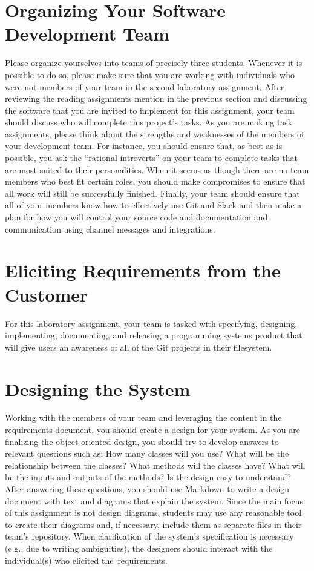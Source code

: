 \section*{Organizing Your Software Development Team}

Please organize yourselves into teams of precisely three students. Whenever it is possible to do so, please make sure that you are
working with individuals who were not members of your team in the second laboratory assignment. After reviewing the
reading assignments mention in the previous section and discussing the software that you are invited to implement for
this assignment, your team should discuss who will complete this project's tasks. As you are making task assignments,
please think about the strengths and weaknesses of the members of your development team. For instance, you should ensure
that, as best as is possible, you ask the ``rational introverts'' on your team to complete tasks that are most suited to
their personalities. When it seems as though there are no team members who best fit certain roles, you should make
compromises to ensure that all work will still be successfully finished. Finally, your team should ensure that all of
your members know how to effectively use Git and Slack and then make a plan for how you will control your source code
and documentation and communication using channel messages and integrations.

\section*{Eliciting Requirements from the Customer}

For this laboratory assignment, your team is tasked with specifying, designing, implementing, documenting, and releasing
a programming systems product that will give users an awareness of all of the Git projects in their filesystem.


\section*{Designing the System}

Working with the members of your team and leveraging the content in the requirements document, you should create a
design for your system.  As you are finalizing the object-oriented design, you should try to develop answers to relevant
questions such as: How many classes will you use? What will be the relationship between the classes? What methods will
the classes have? What will be the inputs and outputs of the methods?  Is the design easy to understand?  After
answering these questions, you should use Markdown to write a design document with text and diagrams that explain the
system. Since the main focus of this assignment is not design diagrams, students may use any reasonable tool to create
their diagrams and, if necessary, include them as separate files in their team's repository. When clarification of the
system's specification is necessary (e.g., due to writing ambiguities), the designers should interact with the
individual(s) who elicited \mbox{the requirements}.

